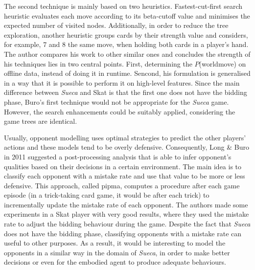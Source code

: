 The second technique is mainly based on two heuristics.
Fastest-cut-first search heuristic evaluates each move according to its beta-cutoff value and minimises the expected number of visited nodes.
Additionally, in order to reduce the tree exploration, another heuristic groups cards by their strength value and considers, for example, 7 and 8 the same move, when holding both cards in a player's hand.
The author compares his work to other similar ones and concludes the strength of his techniques lies in two central points.
First, determining the $P$(world\textbar move) on offline data, instead of doing it in runtime.
Sencond, his formulation is generalised in a way that it is possible to perform it on high-level features.
Since the main difference between \emph{Sueca} and Skat is that the first one does not have the bidding phase, Buro's first technique would not be appropriate for the \emph{Sueca} game.
However, the search enhancements could be suitably applied, considering the game trees are identical.


Usually, opponent modelling uses optimal strategies to predict the other players' actions and these models tend to be overly defensive.
Consequently, Long \& Buro in 2011 \cite{Long2009} suggested a post-processing analysis that is able to infer opponent's qualities based on their decisions in a certain environment.
The main idea is to classify each opponent with a mistake rate and use that value to be more or less defensive.
This approach, called \gls{pipma}, computes a procedure after each game episode (in a trick-taking card game, it would be after each trick) to incrementally update the mistake rate of each opponent.
The authors made some experiments in a Skat player with very good results, where they used the mistake rate to adjust the bidding behaviour during the game.
Despite the fact that \emph{Sueca} does not have the bidding phase, classifying opponents with a mistake rate can useful to other purposes.
As a result, it would be interesting to model the opponents in a similar way in the domain of \emph{Sueca}, in order to make better decisions or even for the embodied agent to produce adequate behaviours.

